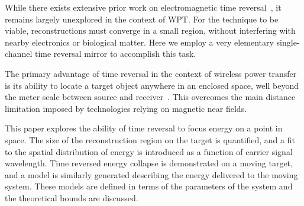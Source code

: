 While there exists extensive prior work on electromagnetic time
reversal~\cite{fink,nltr-wave-chaotic,nltr-classical-waves,tr-green}, it remains
largely unexplored in the context of WPT\@.
%
For the technique to be viable, reconstructions must converge in a small region,
without interfering with nearby electronics or biological matter.
%
Here we employ a very elementary single-channel time reversal mirror to
accomplish this task.



The primary advantage of time reversal in the context of wireless power transfer
is its ability to locate a target object anywhere in an enclosed space, well
beyond the meter scale between source and
receiver~\cite{fink,nltr-wave-chaotic}.
%
This overcomes the main distance limitation imposed by technologies relying
on magnetic near fields.



This paper explores the ability of time reversal to focus energy on a point in
space.
%
The size of the reconstruction region on the target is quantified, and a fit to
the spatial distribution of energy is introduced as a function of carrier signal
wavelength.
%
Time reversed energy collapse is demonstrated on a moving target, and a model is
similarly generated describing the energy delivered to the moving system.
%
These models are defined in terms of the parameters of the system and the
theoretical bounds are discussed.
